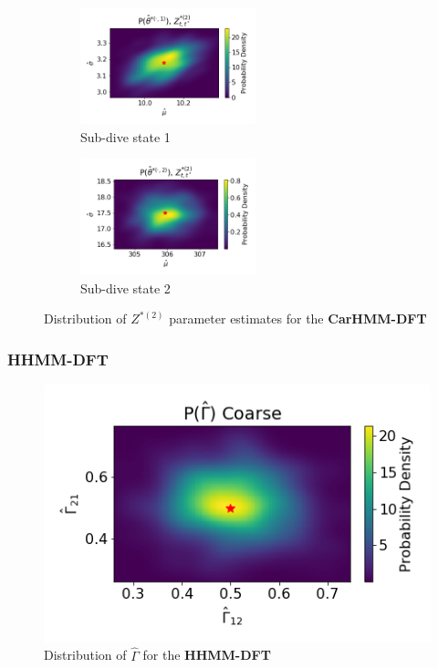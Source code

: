 \documentclass[12pt]{TD-CJS}
\begin{document}
\begin{figure}[ht]
	\centering
	\begin{subfigure}[t]{0.4\textwidth}
        \centering
        \includegraphics[width=2in]{../Plots/hmm_FV_MLE_density_FoVeDBA_0_0.png}
        \caption{Sub-dive state 1}
    \end{subfigure}
    \begin{subfigure}[t]{0.4\textwidth}
        \centering
        \includegraphics[width=2in]{../Plots/hmm_FV_MLE_density_FoVeDBA_0_1.png}
        \caption{Sub-dive state 2}
    \end{subfigure}
    \caption{Distribution of $Z^{*(2)}$ parameter estimates for the \textbf{CarHMM-DFT}}
\end{figure}


\subsubsection{HHMM-DFT}

\begin{figure}
    \centering
    \includegraphics[width=5in]{../Plots/hhmm_FV_uncorr_Gamma_density_-1.png}
    \caption{Distribution of $\hat \Gamma$ for the \textbf{HHMM-DFT}}
\end{figure}
\end{document}
